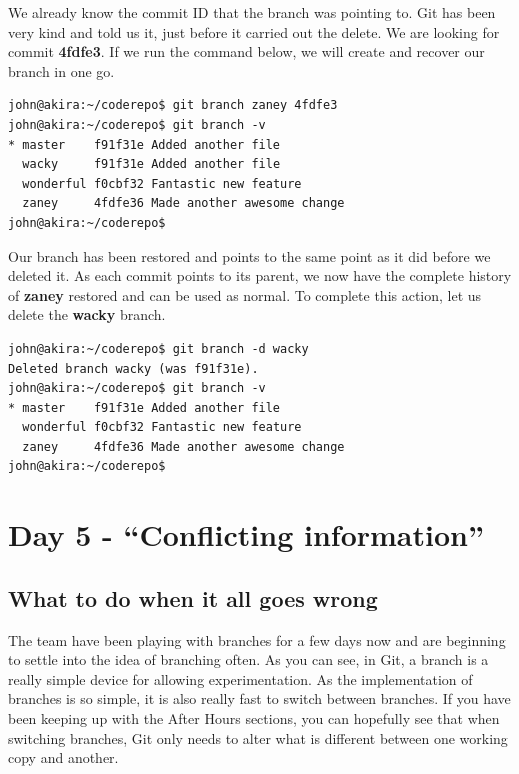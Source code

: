 We already know the commit ID that the branch was pointing to.  Git has been very kind and told us it, just before it carried out the delete.  We are looking for commit \textbf{4fdfe3}.  If we run the command below, we will create and recover our branch in one go.

\begin{Verbatim}[frame=leftline,framerule=1mm,fontsize=\relsize{-3}] 
john@akira:~/coderepo$ git branch zaney 4fdfe3
john@akira:~/coderepo$ git branch -v
* master    f91f31e Added another file
  wacky     f91f31e Added another file
  wonderful f0cbf32 Fantastic new feature
  zaney     4fdfe36 Made another awesome change
john@akira:~/coderepo$ 
\end{Verbatim}

Our branch has been restored and points to the same point as it did before we deleted it.  As each commit points to its parent, we now have the complete history of \textbf{zaney} restored and can be used as normal.  To complete this action, let us delete the \textbf{wacky} branch.

\begin{Verbatim}[frame=leftline,framerule=1mm,fontsize=\relsize{-3}] 
john@akira:~/coderepo$ git branch -d wacky
Deleted branch wacky (was f91f31e).
john@akira:~/coderepo$ git branch -v
* master    f91f31e Added another file
  wonderful f0cbf32 Fantastic new feature
  zaney     4fdfe36 Made another awesome change
john@akira:~/coderepo$ 
\end{Verbatim}


\section{Day 5 - ``Conflicting information''}
\subsection{What to do when it all goes wrong}

The team have been playing with branches for a few days now and are beginning to settle into the idea of branching often.  As you can see, in Git, a branch is a really simple device for allowing experimentation.  As the implementation of branches is so simple, it is also really fast to switch between branches.  If you have been keeping up with the After Hours sections, you can hopefully see that when switching branches, Git only needs to alter what is different between one working copy and another.

